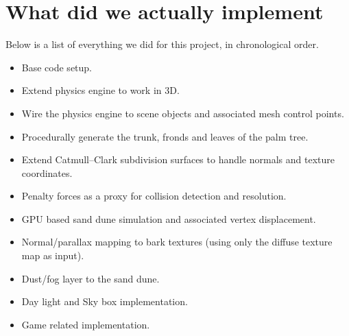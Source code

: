 \documentclass[annual]{acmsiggraph}
\begin{document}
\section{What did we actually implement}
Below is a list of everything we did for this project, in chronological order.
\begin{itemize}
\item{Base code setup.}
\item{Extend physics engine to work in 3D.}
\item{Wire the physics engine to scene objects and associated mesh control points.} 
\item{Procedurally generate the trunk, fronds and leaves of the palm tree.}
\item{Extend Catmull--Clark subdivision surfaces to handle normals and texture coordinates.}
\item{Penalty forces as a proxy for  collision detection and resolution.}
\item{GPU based sand dune simulation and associated vertex displacement.}
\item{Normal/parallax mapping to bark textures (using only the diffuse texture map as input).}
\item{Dust/fog  layer to the sand dune.}
\item{Day light and Sky box implementation.}
\item{Game related implementation.}
\end{itemize}
\end{document}
